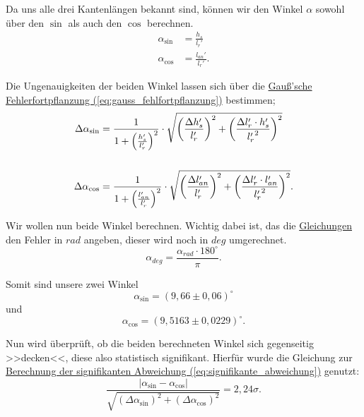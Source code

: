 Da uns alle drei Kantenlängen bekannt sind, können wir den Winkel $\alpha$ sowohl über den $\sin$ als auch den $\cos$ berechnen. 
\begin{align}
    \alpha_{\sin} &= \frac{h_s}{l_r'} \\
    \alpha_{\cos} &= \frac{l_{an}'}{l_r'}.
\end{align}

Die Ungenauigkeiten der beiden Winkel lassen sich über die \hyperref[eq:gauss_fehlfortpflanzung]{Gauß'sche Fehlerfortpflanzung (\ref*{eq:gauss_fehlfortpflanzung})} bestimmen;
\begin{align}
    \Delta \alpha_{\sin} &= \frac{1}{1+\left(\frac{h_s'}{l_r'}\right)^2} \cdot \sqrt{\left(\frac{\Delta h_s'}{l_r'}\right)^2 + \left(\frac{\Delta l_r' \cdot h_s'}{{l_{r}'}^2}\right)^2} \\
    \notag \\
    \Delta \alpha_{\cos} &= \frac{1}{1+\left(\frac{l_{an}'}{l_r'}\right)^2} \cdot \sqrt{\left(\frac{\Delta l_{an}'}{l_r'}\right)^2 + \left(\frac{\Delta l_r' \cdot l_{an}'}{{l_{r}'}^2}\right)^2}.
    \label{eq:fehler_alpha_cos}
\end{align}

Wir wollen nun beide Winkel berechnen. Wichtig dabei ist, das die \hyperref[eq:fehler_alpha_cos]{Gleichungen} den Fehler in $rad$ angeben, dieser wird noch in $deg$ umgerechnet.
\begin{equation}
    \alpha_{deg} = \frac{\alpha_{rad} \cdot 180^\circ}{\pi}.
\end{equation}

Somit sind unsere zwei Winkel
\begin{equation}
\boxed{
    \alpha_{\sin} = (9,66 \pm 0,06) ^\circ
}
\end{equation}
und
\begin{equation}
\boxed{
    \alpha_{\cos} = (9,5163 \pm 0,0229) ^\circ
    \label{eq:alpha_cos}
}.
\end{equation}

Nun wird überprüft, ob die beiden berechneten Winkel sich gegenseitig >>decken<<, diese also statistisch signifikant. Hierfür wurde die Gleichung zur \hyperref[eq:signifikante_abweichung]{Berechnung der signifikanten Abweichung (\ref*{eq:signifikante_abweichung})} genutzt:
\begin{equation}
    \frac{\left| \alpha_{\sin} - \alpha_{\cos} \right|}{\sqrt{(\Delta \alpha_{\sin})^2 + (\Delta \alpha_{\cos})^2}} = 2,24\sigma. 
\end{equation}

